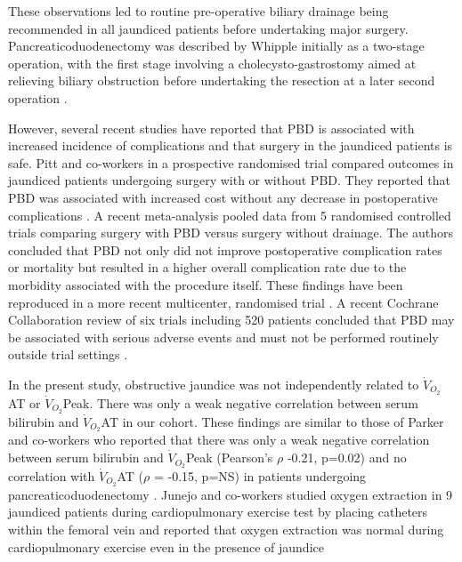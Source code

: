 These observations led to routine pre-operative biliary drainage being recommended in all jaundiced patients before undertaking major surgery. 
Pancreaticoduodenectomy was described by Whipple initially as a two-stage operation, with the first stage involving a cholecysto-gastrostomy aimed at relieving biliary obstruction before undertaking the resection at a later second operation \parencite{whipple_treatment_1935}.

However, several recent studies have reported that PBD is associated with increased incidence of complications and that surgery in the jaundiced patients is safe.
Pitt and co-workers in a prospective randomised trial compared outcomes in jaundiced patients undergoing surgery with or without PBD. They reported that PBD was associated with increased cost without any decrease in postoperative complications \parencite{pitt_does_1985}. 
A recent meta-analysis \parencite{sewnath_meta-analysis_2002} pooled data from 5 randomised controlled trials comparing surgery with PBD versus surgery without drainage.
The authors concluded that PBD not only did not improve postoperative complication rates or mortality but resulted in a higher overall complication rate due to the morbidity associated with the procedure itself. 
These findings have been reproduced in a more recent multicenter, randomised trial \parencite{van_der_gaag_preoperative_2010}.
A recent Cochrane Collaboration review of six trials including 520 patients concluded that PBD may be associated with serious adverse events and must not be performed routinely outside trial settings \parencite{wang_preoperative_2008}.

In the present study, obstructive jaundice was not independently related to $\dot{V}_{O_2}$AT or $\dot{V}_{O_2}$Peak.
There was only a weak negative correlation between serum bilirubin and $\dot{V}_{O_2}$AT in our cohort.
These findings are similar to those of Parker and co-workers who reported that there was only a weak negative correlation between serum bilirubin and  $\dot{V}_{O_2}$Peak (Pearson's $\rho$ -0.21, p=0.02) and no correlation with $\dot{V}_{O_2}$AT ($\rho$ = -0.15, p=NS) in patients undergoing pancreaticoduodenectomy \parencite{parker_serum_2014}. 
Junejo and co-workers studied oxygen extraction in 9 jaundiced patients during cardiopulmonary exercise test by placing catheters within the femoral vein and reported that oxygen extraction was normal during cardiopulmonary exercise even in the presence of jaundice \parencite{junejo_peripheral_2014}

